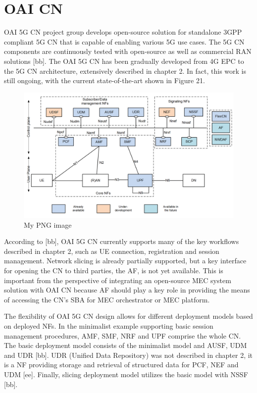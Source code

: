 \documentclass[12pt,a4paper,twoside]{report}
\begin{document}
\section{OAI CN}
OAI 5G CN project group develops open-source solution for standalone 3GPP compliant 5G CN that is capable of enabling various 5G use cases. The 5G CN components are continuously tested with open-source as well as commercial RAN solutions [bb]. The OAI 5G CN has been gradually developed from 4G EPC to the 5G CN architecture, extensively described in chapter 2. In fact, this work is still ongoing, with the current state-of-the-art shown in Figure 21.
\begin{figure}[ht]
	\centering
	\includegraphics[width=13cm]{./images/OAI-CN-soa.png} 
	\caption{My PNG image}
\end{figure}
According to [bb], OAI 5G CN currently supports many of the key workflows described in chapter 2, such as UE connection, registration and session management. Network slicing is already partially supported, but a key interface for opening the CN to third parties, the AF, is not yet available. This is important from the perspective of integrating an open-source MEC system solution with OAI CN because AF should play a key role in providing the means of accessing the CN’s SBA for MEC orchestrator or MEC platform. 

The flexibility of OAI 5G CN design allows for different deployment models based on deployed NFs. In the minimalist example supporting basic session management procedures, AMF, SMF, NRF and UPF comprise the whole CN. The basic deployment model consists of the minimalist model and AUSF, UDM and UDR [bb]. UDR (Unified Data Repository) was not described in chapter 2, it is a NF providing storage and retrieval of structured data for PCF, NEF and UDM [ee]. Finally, slicing deployment model utilizes the basic model with NSSF [bb]. 
\end{document}
